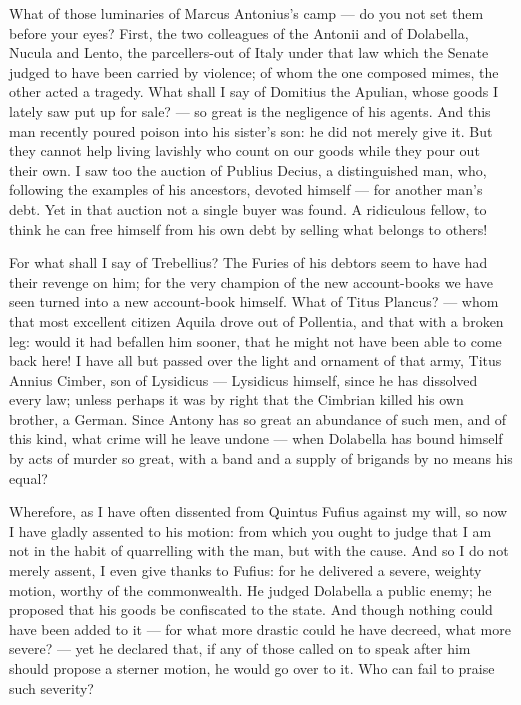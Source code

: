  What of those luminaries of Marcus Antonius's camp --- do you not set them before your eyes? First, the two colleagues of the Antonii and of Dolabella, Nucula and Lento, the parcellers-out of Italy under that law which the Senate judged to have been carried by violence; of whom the one composed mimes, the other acted a tragedy. What shall I say of Domitius the Apulian, whose goods I lately saw put up for sale? --- so great is the negligence of his agents. And this man recently poured poison into his sister's son: he did not merely give it. But they cannot help living lavishly who count on our goods while they pour out their own. I saw too the auction of Publius Decius, a distinguished man, who, following the examples of his ancestors, devoted himself --- for another man's debt. Yet in that auction not a single buyer was found. A ridiculous fellow, to think he can free himself from his own debt by selling what belongs to others!

 For what shall I say of Trebellius? The Furies of his debtors seem to have had their revenge on him; for the very champion of the new account-books we have seen turned into a new account-book himself. What of Titus Plancus? --- whom that most excellent citizen Aquila drove out of Pollentia, and that with a broken leg: would it had befallen him sooner, that he might not have been able to come back here! I have all but passed over the light and ornament of that army, Titus Annius Cimber, son of Lysidicus --- Lysidicus himself, since he has dissolved every law; unless perhaps it was by right that the Cimbrian killed his own brother, a German. Since Antony has so great an abundance of such men, and of this kind, what crime will he leave undone --- when Dolabella has bound himself by acts of murder so great, with a band and a supply of brigands by no means his equal?

 Wherefore, as I have often dissented from Quintus Fufius against my will, so now I have gladly assented to his motion: from which you ought to judge that I am not in the habit of quarrelling with the man, but with the cause. And so I do not merely assent, I even give thanks to Fufius: for he delivered a severe, weighty motion, worthy of the commonwealth. He judged Dolabella a public enemy; he proposed that his goods be confiscated to the state. And though nothing could have been added to it --- for what more drastic could he have decreed, what more severe? --- yet he declared that, if any of those called on to speak after him should propose a sterner motion, he would go over to it. Who can fail to praise such severity?

